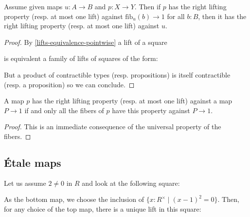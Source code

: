 \begin{lemma}
\label{pointwise-lift-is-enough}
Assume given maps $u:A\to B$ and $p:X\to Y$.
Then if $p$ has the right lifting property (resp. at most one lift) against $\mathrm{fib}_u(b)\to 1$ for all $b:B$, then it has the right lifting property (resp. at most one lift) against $u$.
\end{lemma}

\begin{proof}
By \cref{lifts-equivalence-pointwise} a lift of a square
 \begin{center}
  \end{center}
  is equivalent a family of lifts of squares of the form: 
   \begin{center}
  \end{center}
  But a product of contractible types (resp. propositions) is itself contractible (resp. a proposition) so we can conclude. 
\end{proof}

\begin{lemma}
\label{lifting-defined-fiberwise}
A map $p$ has the right lifting property (resp. at most one lift) against a map $P\to 1$ if and only all the fibers of $p$ have this property against $P\to 1$.
\end{lemma}

\begin{proof}
This is an immediate consequence of the universal property of the fibers.
\end{proof}

\subsection{\'Etale maps}

\begin{example}
  Let us assume $2\neq 0$ in $R$ and look at the following square:
  \begin{center}
  \end{center}
  As the bottom map, we choose the inclusion of $\{x:R^\times \mid (x-1)^2=0 \}$.
  Then, for any choice of the top map, there is a unique lift in this square:
  \begin{center}
  \end{center}
\end{example}

